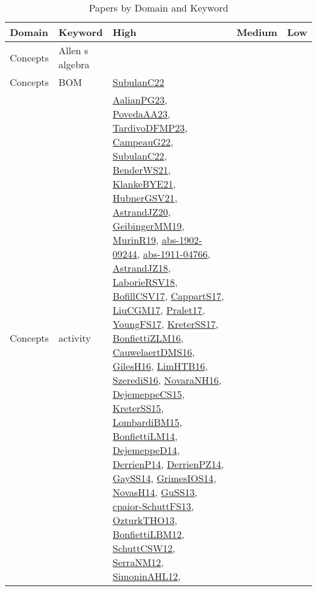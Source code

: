 {\scriptsize
\begin{longtable}{lp{3cm}>{\raggedright}p{6cm}>{\raggedright}p{6cm}p{8cm}}
\caption{Papers by Domain and Keyword}\\ \toprule
Domain & Keyword & High & Medium & Low\\ \midrule\endhead
\bottomrule
\endfoot
Concepts & Allen s algebra &  &  & \\
Concepts & BOM & \href{articles/SubulanC22.pdf}{SubulanC22}\cite{SubulanC22} &  & \\
Concepts & activity & \href{papers/AalianPG23.pdf}{AalianPG23}\cite{AalianPG23}, \href{papers/PovedaAA23.pdf}{PovedaAA23}\cite{PovedaAA23}, \href{papers/TardivoDFMP23.pdf}{TardivoDFMP23}\cite{TardivoDFMP23}, \href{articles/CampeauG22.pdf}{CampeauG22}\cite{CampeauG22}, \href{articles/SubulanC22.pdf}{SubulanC22}\cite{SubulanC22}, \href{papers/BenderWS21.pdf}{BenderWS21}\cite{BenderWS21}, \href{papers/KlankeBYE21.pdf}{KlankeBYE21}\cite{KlankeBYE21}, \href{articles/HubnerGSV21.pdf}{HubnerGSV21}\cite{HubnerGSV21}, \href{articles/AstrandJZ20.pdf}{AstrandJZ20}\cite{AstrandJZ20}, \href{papers/GeibingerMM19.pdf}{GeibingerMM19}\cite{GeibingerMM19}, \href{papers/MurinR19.pdf}{MurinR19}\cite{MurinR19}, \href{articles/abs-1902-09244.pdf}{abs-1902-09244}\cite{abs-1902-09244}, \href{articles/abs-1911-04766.pdf}{abs-1911-04766}\cite{abs-1911-04766}, \href{papers/AstrandJZ18.pdf}{AstrandJZ18}\cite{AstrandJZ18}, \href{articles/LaborieRSV18.pdf}{LaborieRSV18}\cite{LaborieRSV18}, \href{papers/BofillCSV17.pdf}{BofillCSV17}\cite{BofillCSV17}, \href{papers/CappartS17.pdf}{CappartS17}\cite{CappartS17}, \href{papers/LiuCGM17.pdf}{LiuCGM17}\cite{LiuCGM17}, \href{papers/Pralet17.pdf}{Pralet17}\cite{Pralet17}, \href{papers/YoungFS17.pdf}{YoungFS17}\cite{YoungFS17}, \href{articles/KreterSS17.pdf}{KreterSS17}\cite{KreterSS17}, \href{papers/BonfiettiZLM16.pdf}{BonfiettiZLM16}\cite{BonfiettiZLM16}, \href{papers/CauwelaertDMS16.pdf}{CauwelaertDMS16}\cite{CauwelaertDMS16}, \href{papers/GilesH16.pdf}{GilesH16}\cite{GilesH16}, \href{papers/LimHTB16.pdf}{LimHTB16}\cite{LimHTB16}, \href{papers/SzerediS16.pdf}{SzerediS16}\cite{SzerediS16}, \href{articles/NovaraNH16.pdf}{NovaraNH16}\cite{NovaraNH16}, \href{papers/DejemeppeCS15.pdf}{DejemeppeCS15}\cite{DejemeppeCS15}, \href{papers/KreterSS15.pdf}{KreterSS15}\cite{KreterSS15}, \href{papers/LombardiBM15.pdf}{LombardiBM15}\cite{LombardiBM15}, \href{papers/BonfiettiLM14.pdf}{BonfiettiLM14}\cite{BonfiettiLM14}, \href{papers/DejemeppeD14.pdf}{DejemeppeD14}\cite{DejemeppeD14}, \href{papers/DerrienP14.pdf}{DerrienP14}\cite{DerrienP14}, \href{papers/DerrienPZ14.pdf}{DerrienPZ14}\cite{DerrienPZ14}, \href{papers/GaySS14.pdf}{GaySS14}\cite{GaySS14}, \href{articles/GrimesIOS14.pdf}{GrimesIOS14}\cite{GrimesIOS14}, \href{articles/NovasH14.pdf}{NovasH14}\cite{NovasH14}, \href{papers/GuSS13.pdf}{GuSS13}\cite{GuSS13}, \href{papers/cpaior-SchuttFS13.pdf}{cpaior-SchuttFS13}\cite{cpaior-SchuttFS13}, \href{articles/OzturkTHO13.pdf}{OzturkTHO13}\cite{OzturkTHO13}, \href{papers/BonfiettiLBM12.pdf}{BonfiettiLBM12}\cite{BonfiettiLBM12}, \href{papers/SchuttCSW12.pdf}{SchuttCSW12}\cite{SchuttCSW12}, \href{papers/SerraNM12.pdf}{SerraNM12}\cite{SerraNM12}, \href{papers/SimoninAHL12.pdf}{SimoninAHL12}\cite{SimoninAHL12}, 
\end{longtable}}
